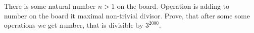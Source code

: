 \ifshowproblem
\begin{problem}\label{example:RUS-2015-TMO-S-P5}
    There is some natural number $n>1$ on the board. Operation is adding to number on the board it maximal non-trivial divisor.
    Prove, that after some some operations we get number, that is divisible by $3^{2000}$.
\end{problem}
\fi

\footnotemark
{}
\fi